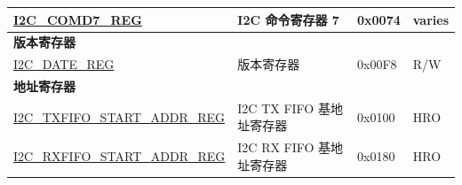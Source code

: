 \begin{longtable}{ | p{6cm} | p{7cm} | p{1.3cm} | p{1cm} | }
    \hyperref[regdesc:I2CCOMD7REG]{I2C\_COMD7\_REG} & I2C 命令寄存器 7 & 0x0074 & varies \\ \hline
    \multicolumn{4}{|l|}{\textbf{版本寄存器}} \\ \hline
    \hyperref[regdesc:I2CDATEREG]{I2C\_DATE\_REG} & 版本寄存器 & 0x00F8 & R/W \\ \hline
    \multicolumn{4}{|l|}{\textbf{地址寄存器}} \\ \hline
    \hyperref[regdesc:I2CTXFIFOSTARTADDRREG]{I2C\_TXFIFO\_START\_ADDR\_REG} & I2C TX FIFO 基地址寄存器 & 0x0100 & HRO \\ \hline
    \hyperref[regdesc:I2CRXFIFOSTARTADDRREG]{I2C\_RXFIFO\_START\_ADDR\_REG} & I2C RX FIFO 基地址寄存器 & 0x0180 & HRO \\ \hline
    \end{longtable}
